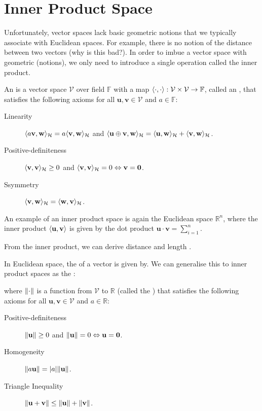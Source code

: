\section{Inner Product Space}
Unfortunately, vector spaces lack basic geometric notions that we typically associate with Euclidean spaces. For example, there is no notion of the distance between two vectors (why is this bad?). In order to imbue a vector space with geometric (notions), we only need to introduce a single operation called the inner product.
%
\begin{definition}
An  is a vector space $\mathcal{V}$ over field $\mathbb{F}$ with a map $\langle\cdot, \cdot\rangle : \mathcal{V} \times \mathcal{V} \to \mathbb{F}$, called an , that satisfies the following axioms for all $\mathbf{u}, \mathbf{v} \in \mathcal{V}$ and $a \in \mathbb{F}$:
%
\begin{description}
  \item[Linearity] $\langle a \mathbf{v}, \mathbf{w}\rangle_\mathcal{H} = a \langle\mathbf{v}, \mathbf{w}\rangle_\mathcal{H}$ and $\langle\mathbf{u} \oplus \mathbf{v}, \mathbf{w}\rangle_\mathcal{H} = \langle\mathbf{u}, \mathbf{w}\rangle_\mathcal{H} + \langle\mathbf{v}, \mathbf{w}\rangle_\mathcal{H}$.
  \item[Positive-definiteness] $\langle\mathbf{v}, \mathbf{v}\rangle_\mathcal{H} \geq 0$ and $\langle\mathbf{v}, \mathbf{v}\rangle_\mathcal{H} = 0 \Leftrightarrow \mathbf{v} = \mathbf{0}$.
  \item[Ssymmetry] $\langle\mathbf{v}, \mathbf{w}\rangle_\mathcal{H} = \langle\mathbf{w}, \mathbf{v}\rangle_\mathcal{H}$.
\end{description}
\end{definition}
%
An example of an inner product space is again the Euclidean space $\mathbb{R}^n$, where the inner product $\langle\mathbf{u}, \mathbf{v}\rangle$ is given by the dot product $\mathbf{u} \cdot \mathbf{v} = \sum_{i=1}^n$.

From the inner product, we can derive distance and length .

In Euclidean space, the  of a vector is given by. We can generalise this to inner product spaces as the :
\begin{definition}[Norm]
where $\lVert\cdot\rVert$ is a function from $\mathcal{V}$ to $\mathbb{R}$ (called the ) that satisfies the following axioms for all $\mathbf{u}, \mathbf{v} \in \mathcal{V}$ and $a \in \mathbb{R}$:
\begin{description}
  \item[Positive-definiteness] $\lVert\mathbf{u}\rVert \geq 0$ and $\lVert\mathbf{u}\rVert = 0 \Leftrightarrow \mathbf{u} = \mathbf{0}$.
  \item[Homogeneity] $\lVert a \mathbf{u}\rVert = \lvert a\rvert \lVert\mathbf{u}\rVert$.
  \item[Triangle Inequality] $\lVert\mathbf{u} + \mathbf{v}\rVert \leq \lVert\mathbf{u}\rVert + \lVert\mathbf{v}\rVert$.
\end{description}
\end{definition}

